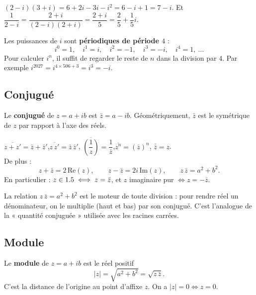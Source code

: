 \begin{exemple}
$(2-i)(3+i)=6+2i-3i-i^{2}=6-i+1=7-i$. Et
$\dfrac{1}{2-i}=\dfrac{2+i}{(2-i)(2+i)}=\dfrac{2+i}{5}=\dfrac25+\dfrac15 i$.
\end{exemple}

\begin{aretenir}
Les puissances de $i$ sont \textbf{périodiques de période $4$} :
\[
i^{0}=1,\quad i^{1}=i,\quad i^{2}=-1,\quad i^{3}=-i,\quad i^{4}=1,\ \dots
\]
Pour calculer $i^{n}$, il suffit de regarder le reste de $n$ dans la division par $4$. Par exemple
$i^{2027}=i^{4\times506+3}=i^{3}=-i$.
\end{aretenir}

\subsection{Conjugué}

\begin{definition}[Conjugué]
Le \textbf{conjugué} de $z=a+ib$ est $\bar z=a-ib$. Géométriquement, $\bar z$ est le symétrique de
$z$ par rapport à l'axe des réels.
\end{definition}

\begin{propriete}
$\overline{z+z'}=\bar z+\bar z'$,\quad $\overline{z\,z'}=\bar z\,\bar z'$,\quad
$\overline{\left(\dfrac1z\right)}=\dfrac1{\bar z}$,\quad $\overline{z^{n}}=(\bar z)^{n}$,\quad
$\overline{\bar z}=z$.\\[2pt]
De plus :
\[
z+\bar z=2\,\mathrm{Re}(z),\qquad z-\bar z=2i\,\mathrm{Im}(z),\qquad z\,\bar z=a^{2}+b^{2}.
\]
En particulier : $z\in1.5\iff z=\bar z$, et $z$ imaginaire pur $\iff z=-\bar z$.
\end{propriete}

\begin{remarque}
La relation $z\,\bar z=a^{2}+b^{2}$ est le moteur de toute division : pour rendre réel un
dénominateur, on le multiplie (haut et bas) par son conjugué. C'est l'analogue de la
« quantité conjuguée » utilisée avec les racines carrées.
\end{remarque}

\subsection{Module}

\begin{definition}[Module]
Le \textbf{module} de $z=a+ib$ est le réel positif
\[
|z|=\sqrt{a^{2}+b^{2}}=\sqrt{z\,\bar z}.
\]
C'est la distance de l'origine au point d'affixe $z$. On a $|z|=0\iff z=0$.
\end{definition}

